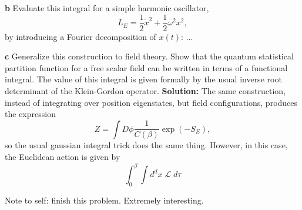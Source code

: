 \documentclass[main.tex]{subfiles}
\begin{document}
\textbf{b} Evaluate this integral for a simple harmonic oscillator, 
\[
L_E = \frac{1}{2} \dot{x}^2 + \frac{1}{2} \omega^2 x^2 ,
\]
by introducing a Fourier decomposition of $x(t)$:
... 

\textbf{c} Generalize this construction to field theory. Show that the quantum statistical partition function for a free scalar field can be written in terms of a functional integral. The value of this integral is given formally by the usual inverse root determinant of the Klein-Gordon operator. \newline
\textbf{Solution:} \newline
The same construction, instead of integrating over position eigenstates, but field configurations, produces the expression
\[
Z = \int D\phi \frac{1}{C(\beta)} \exp(-S_E),
\]
so the usual gaussian integral trick does the same thing. However, in this case, the Euclidean action is given by 
\[
\int_0^\beta \int d^d x \; \mathcal{L} \; d\tau
\]

Note to self: finish this problem. Extremely interesting.
\end{document}
